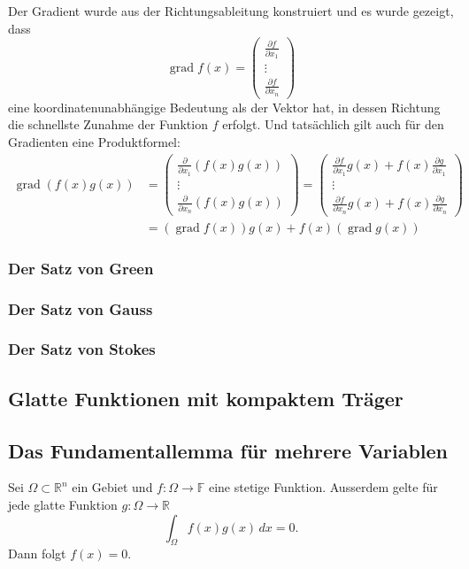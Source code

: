 Der Gradient wurde aus der Richtungsableitung konstruiert und es wurde
gezeigt, dass 
\[
\operatorname{grad} f(x)
=
\begin{pmatrix}
\frac{\partial f}{\partial x_1}\\
\vdots\\
\frac{\partial f}{\partial x_n}
\end{pmatrix}
\]
eine koordinatenunabhängige Bedeutung als der Vektor hat, in dessen
Richtung die schnellste Zunahme der Funktion $f$ erfolgt.
Und tatsächlich gilt auch für den Gradienten eine Produktformel:
\begin{align*}
\operatorname{grad}(f(x)g(x))
&=
\begin{pmatrix}
\frac{\partial}{\partial x_1}(f(x)g(x))\\
\vdots\\
\frac{\partial}{\partial x_n}(f(x)g(x))
\end{pmatrix}
=
\begin{pmatrix}
\frac{\partial f}{\partial x_1} g(x)
+
f(x) \frac{\partial g}{\partial x_1}\\
\vdots\\
\frac{\partial f}{\partial x_n} g(x)
+
f(x) \frac{\partial g}{\partial x_n}
\end{pmatrix}
\\
&=
(\operatorname{grad}f(x)) g(x)
+
f(x)(\operatorname{grad}g(x))
\end{align*}

%
%
\subsubsection{Der Satz von Green}

%
%
\subsubsection{Der Satz von Gauss}

%
%
\subsubsection{Der Satz von Stokes}

%
%
\subsection{Glatte Funktionen mit kompaktem Träger}

%
%
\subsection{Das Fundamentallemma für mehrere Variablen}

\begin{satz}[Fundamentallemma]
Sei $\Omega\subset\mathbb{R}^n$ ein Gebiet und $f\colon \Omega\to\mathbb{F}$
eine stetige Funktion.
Ausserdem gelte für jede glatte Funktion $g\colon\Omega\to\mathbb{R}$ 
\[
\int_{\Omega} f(x)g(x)\,dx = 0.
\]
Dann folgt $f(x)=0$.
\end{satz}
